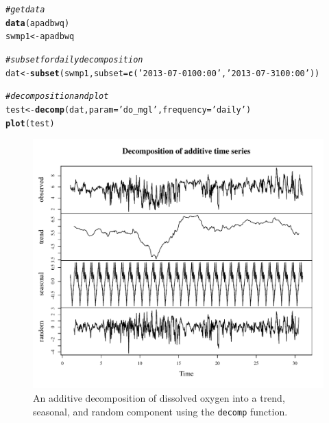 \documentclass[10pt,letterpaper]{article}\usepackage[]{graphicx}\usepackage[]{color}
\makeatletter
\def\maxwidth{ %
  \ifdim\Gin@nat@width>\linewidth
    \linewidth
  \else
    \Gin@nat@width
  \fi
}
\newcommand{\hlstr}[1]{\textcolor[rgb]{0.192,0.494,0.8}{#1}}%
\newcommand{\hlcom}[1]{\textcolor[rgb]{0.678,0.584,0.686}{\textit{#1}}}%
\newcommand{\hlstd}[1]{\textcolor[rgb]{0.345,0.345,0.345}{#1}}%
\newcommand{\hlkwb}[1]{\textcolor[rgb]{0.69,0.353,0.396}{#1}}%
\newcommand{\hlkwc}[1]{\textcolor[rgb]{0.333,0.667,0.333}{#1}}%
\newcommand{\hlkwd}[1]{\textcolor[rgb]{0.737,0.353,0.396}{\textbf{#1}}}%
\newenvironment{kframe}{%
 \def\at@end@of@kframe{}%
 \ifinner\ifhmode%
  \def\at@end@of@kframe{\end{minipage}}%
  \begin{minipage}{\columnwidth}%
 \fi\fi%
 \def\FrameCommand##1{\hskip\@totalleftmargin \hskip-\fboxsep
 \colorbox{shadecolor}{##1}\hskip-\fboxsep
     \hskip-\linewidth \hskip-\@totalleftmargin \hskip\columnwidth}%
 \MakeFramed {\advance\hsize-\width
   \@totalleftmargin\z@ \linewidth\hsize
   \@setminipage}}%
 {\par\unskip\endMakeFramed%
 \at@end@of@kframe}
\newenvironment{knitrout}{}{} %
\makeatother
\begin{document}
\begin{knitrout}
\color{fgcolor}\begin{kframe}
\begin{alltt}
\hlcom{# get data}
\hlkwd{data}\hlstd{(apadbwq)}
\hlstd{swmp1} \hlkwb{<-} \hlstd{apadbwq}

\hlcom{# subset for daily decomposition}
\hlstd{dat} \hlkwb{<-} \hlkwd{subset}\hlstd{(swmp1,} \hlkwc{subset} \hlstd{=} \hlkwd{c}\hlstd{(}\hlstr{'2013-07-01 00:00'}\hlstd{,} \hlstr{'2013-07-31 00:00'}\hlstd{))}

\hlcom{# decomposition and plot}
\hlstd{test} \hlkwb{<-} \hlkwd{decomp}\hlstd{(dat,} \hlkwc{param} \hlstd{=} \hlstr{'do_mgl'}\hlstd{,} \hlkwc{frequency} \hlstd{=} \hlstr{'daily'}\hlstd{)}
\hlkwd{plot}\hlstd{(test)}
\end{alltt}
\end{kframe}\begin{figure}[!ht]


{\centering \includegraphics[width=\maxwidth]{figure/decomp_ex1} 

}

\caption[An additive decomposition of dissolved oxygen into a trend, seasonal, and random component using the \texttt{decomp} function]{An additive decomposition of dissolved oxygen into a trend, seasonal, and random component using the \texttt{decomp} function.\label{fig:decomp_ex1}}
\end{figure}


\end{knitrout}
\end{document}
